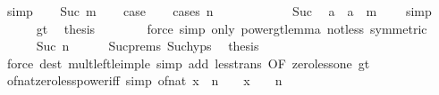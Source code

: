 \begin{isabellebody}
\ simp\isanewline
{}\isamarkupfalse%
\isanewline
\ \ \isamarkupfalse%
\ {\isacharparenleft}{\kern0pt}Suc\ m{\isacharparenright}{\kern0pt}\isanewline
\ \ \isamarkupfalse%
\ {\isacharquery}{\kern0pt}case\isanewline
\ \ \isamarkupfalse%
\ {\isacharparenleft}{\kern0pt}cases\ n{\isacharparenright}{\kern0pt}\isanewline
\ \ \ \ \isamarkupfalse%
\ {}\isanewline
\ \ \ \ \isamarkupfalse%
\ Suc\ \isamarkupfalse%
\ {\isachardoublequoteopen}a\ {\isacharasterisk}{\kern0pt}\ a\ {\isacharcircum}{\kern0pt}\ m\ {\isasymle}\ {}{\isachardoublequoteclose}\ \isamarkupfalse%
\ simp\isanewline
\ \ \ \ \isamarkupfalse%
\ gt{}\ \isamarkupfalse%
\ {\isacharquery}{\kern0pt}thesis\isanewline
\ \ \ \ \ \ \isamarkupfalse%
\ {\isacharparenleft}{\kern0pt}force\ simp\ only{\isacharcolon}{\kern0pt}\ power{\isacharunderscore}{\kern0pt}gt{}{\isacharunderscore}{\kern0pt}lemma\ not{\isacharunderscore}{\kern0pt}less\ {\isacharbrackleft}{\kern0pt}symmetric{\isacharbrackright}{\kern0pt}{\isacharparenright}{\kern0pt}\isanewline
\ \ \isamarkupfalse%
\isanewline
\ \ \ \ \isamarkupfalse%
\ {\isacharparenleft}{\kern0pt}Suc\ n{\isacharparenright}{\kern0pt}\isanewline
\ \ \ \ \isamarkupfalse%
\ Suc{\isachardot}{\kern0pt}prems\ Suc{\isachardot}{\kern0pt}hyps\ \isamarkupfalse%
\ {\isacharquery}{\kern0pt}thesis\isanewline
\ \ \ \ \ \ \isamarkupfalse%
\ {\isacharparenleft}{\kern0pt}force\ dest{\isacharcolon}{\kern0pt}\ mult{\isacharunderscore}{\kern0pt}left{\isacharunderscore}{\kern0pt}le{\isacharunderscore}{\kern0pt}imp{\isacharunderscore}{\kern0pt}le\ simp\ add{\isacharcolon}{\kern0pt}\ less{\isacharunderscore}{\kern0pt}trans\ {\isacharbrackleft}{\kern0pt}OF\ zero{\isacharunderscore}{\kern0pt}less{\isacharunderscore}{\kern0pt}one\ gt{}{\isacharbrackright}{\kern0pt}{\isacharparenright}{\kern0pt}\isanewline
\ \ \isamarkupfalse%
\isanewline
{}\isamarkupfalse%
%
\endisatagproof
{\isafoldproof}%
%
\isadelimproof
\isanewline
%
\endisadelimproof
\isanewline
{}\isamarkupfalse%
\ of{\isacharunderscore}{\kern0pt}nat{\isacharunderscore}{\kern0pt}zero{\isacharunderscore}{\kern0pt}less{\isacharunderscore}{\kern0pt}power{\isacharunderscore}{\kern0pt}iff\ {\isacharbrackleft}{\kern0pt}simp{\isacharbrackright}{\kern0pt}{\isacharcolon}{\kern0pt}\ {\isachardoublequoteopen}of{\isacharunderscore}{\kern0pt}nat\ x\ {\isacharcircum}{\kern0pt}\ n\ {\isachargreater}{\kern0pt}\ {}\ {\isasymlongleftrightarrow}\ x\ {\isachargreater}{\kern0pt}\ {}\ {\isasymor}\ n\ {\isacharequal}{\kern0pt}\ {}{\isachardoublequoteclose}\isanewline

\end{isabellebody}

